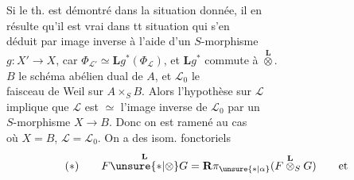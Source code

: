 Si le th. est démontré dans la situation donnée, il en\\
résulte qu'il est vrai dans tt situation  qui s'en\\
déduit par image inverse à l'aide d'un $S$-morphisme\\
$g:X'\longrightarrow X$, car $\Phi_{\mathcal L'}\simeq\mathbf Lg^*(\Phi_{\mathcal L})$, et $\mathbf Lg^*$ commute à $\overset{\mathbf L}{\otimes}$.\\
 $B$ le schéma abélien dual de $A$, et $\mathcal L_0$ le\\
faisceau de Weil sur $A\times_S B$. Alors l'hypothèse sur $\mathcal L$\\
implique que $\mathcal L$ est $\simeq$ l'image inverse de $\mathcal L_0$ par un\\
$S$-morphisme $X\longrightarrow B$. Donc on est ramené au cas\\
où $X=B$, $\mathcal L=\mathcal L_0$.  On a des isom. fonctoriels
\[
(*)\qquad F\overset{\mathbf L}{\unsure{*|\otimes}}G=
\mathbf R\pi_{\unsure{*|\alpha}}(F\overset{\mathbf L}{\otimes}_S G)\qquad\text{et}
\]


